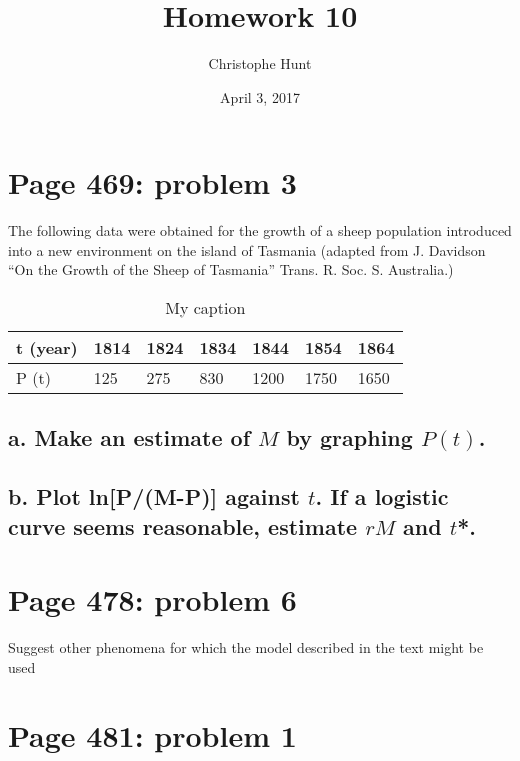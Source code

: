 \documentclass[]{article}
\title{Homework 10}
\author{Christophe Hunt}
\date{April 3, 2017}
\begin{document}
\maketitle

{
\setcounter{tocdepth}{2}
\tableofcontents
}
\newpage

\section{Page 469: problem 3}\label{page-469-problem-3}

The following data were obtained for the growth of a sheep population
introduced into a new environment on the island of Tasmania (adapted
from J. Davidson ``On the Growth of the Sheep of Tasmania'' Trans. R.
Soc. S. Australia.)

\begin{table}[!h]
\centering
\caption{My caption}
\label{my-label}
\begin{tabular}{l|llllll}
t (year) & 1814 & 1824 & 1834 & 1844 & 1854 & 1864 \\ \hline
P (t) & 125 & 275 & 830 & 1200 & 1750 & 1650
\end{tabular}
\end{table}

\subsection{\texorpdfstring{a. Make an estimate of \(M\) by graphing
\(P(t)\).}{a. Make an estimate of M by graphing P(t).}}\label{a.-make-an-estimate-of-m-by-graphing-pt.}

\subsection{\texorpdfstring{b. Plot ln{[}P/(M-P){]} against \(t\). If a
logistic curve seems reasonable, estimate \(rM\) and
\(t\)*.}{b. Plot ln{[}P/(M-P){]} against t. If a logistic curve seems reasonable, estimate rM and t*.}}\label{b.-plot-lnpm-p-against-t.-if-a-logistic-curve-seems-reasonable-estimate-rm-and-t.}

\section{Page 478: problem 6}\label{page-478-problem-6}

Suggest other phenomena for which the model described in the text might
be used

\section{Page 481: problem 1}\label{page-481-problem-1}
\end{document}
